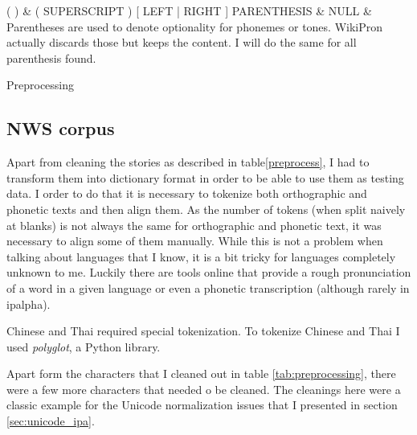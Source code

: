 {\begin{tabularx}{\textwidth}
\hline
( ) 						& \scriptsize{( SUPERSCRIPT ) [ LEFT | RIGHT ] PARENTHESIS}		& NULL							& Parentheses are used to denote optionality for phonemes or tones. WikiPron actually discards those but keeps the content. I will do the same for all parenthesis found.  \\\hline
\end{tabularx}}{Preprocessing}

\subsection*{NWS corpus}
Apart from cleaning the stories as described in table\ref{preprocess}, I had to transform them into dictionary format in order to be able to use them as testing data. I order to do that it is necessary to tokenize both orthographic and phonetic texts and then align them. As the number of tokens (when split naively at blanks) is not always the same for orthographic and phonetic text, it was necessary to align some of them manually. While this is not a problem when talking about languages that I know, it is a bit tricky for languages completely unknown to me. Luckily there are tools online that provide a rough pronunciation of a word in a given language or even a phonetic transcription (although rarely in \ac{ipalpha}). 

Chinese and Thai required special tokenization. To tokenize Chinese and Thai I used \textit{polyglot}, a Python library.

Apart form the characters that I cleaned out in table \ref{tab:preprocessing}, there were a few more characters that needed o be cleaned. The cleanings here were a classic example for the Unicode normalization issues that I presented in section \ref{sec:unicode_ipa}. 



